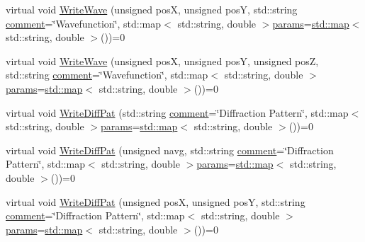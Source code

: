 \begin{DoxyCompactItemize}
\item 
virtual void \hyperlink{class_q_s_t_e_m_1_1_i_wave_af0a308ede62dc83872ccf6efa47e6ed6}{Write\-Wave} (unsigned pos\-X, unsigned pos\-Y, std\-::string \hyperlink{image_sim_8m_aea4cc4bd8e43a7f8ebf9b0ee3da8d681}{comment}=\char`\"{}Wavefunction\char`\"{}, std\-::map$<$ std\-::string, double $>$\hyperlink{image_sim_8m_ad57b218fb254a1624c09ad71cb6b6415}{params}=\hyperlink{_displacement_params_8m_af619c74fd72bdb64d115463dff2720cd}{std\-::map}$<$ std\-::string, double $>$())=0
\item 
virtual void \hyperlink{class_q_s_t_e_m_1_1_i_wave_a9e9f05935b04646a547d2d20e9cf9731}{Write\-Wave} (unsigned pos\-X, unsigned pos\-Y, unsigned pos\-Z, std\-::string \hyperlink{image_sim_8m_aea4cc4bd8e43a7f8ebf9b0ee3da8d681}{comment}=\char`\"{}Wavefunction\char`\"{}, std\-::map$<$ std\-::string, double $>$\hyperlink{image_sim_8m_ad57b218fb254a1624c09ad71cb6b6415}{params}=\hyperlink{_displacement_params_8m_af619c74fd72bdb64d115463dff2720cd}{std\-::map}$<$ std\-::string, double $>$())=0
\item 
virtual void \hyperlink{class_q_s_t_e_m_1_1_i_wave_a1d9416e506e6b86ae844ccec94e14c80}{Write\-Diff\-Pat} (std\-::string \hyperlink{image_sim_8m_aea4cc4bd8e43a7f8ebf9b0ee3da8d681}{comment}=\char`\"{}Diffraction Pattern\char`\"{}, std\-::map$<$ std\-::string, double $>$\hyperlink{image_sim_8m_ad57b218fb254a1624c09ad71cb6b6415}{params}=\hyperlink{_displacement_params_8m_af619c74fd72bdb64d115463dff2720cd}{std\-::map}$<$ std\-::string, double $>$())=0
\item 
virtual void \hyperlink{class_q_s_t_e_m_1_1_i_wave_a97f5d380249b100d5681132090e24a1e}{Write\-Diff\-Pat} (unsigned navg, std\-::string \hyperlink{image_sim_8m_aea4cc4bd8e43a7f8ebf9b0ee3da8d681}{comment}=\char`\"{}Diffraction Pattern\char`\"{}, std\-::map$<$ std\-::string, double $>$\hyperlink{image_sim_8m_ad57b218fb254a1624c09ad71cb6b6415}{params}=\hyperlink{_displacement_params_8m_af619c74fd72bdb64d115463dff2720cd}{std\-::map}$<$ std\-::string, double $>$())=0
\item 
virtual void \hyperlink{class_q_s_t_e_m_1_1_i_wave_ad235239efe950037361fbbab7fb61d0d}{Write\-Diff\-Pat} (unsigned pos\-X, unsigned pos\-Y, std\-::string \hyperlink{image_sim_8m_aea4cc4bd8e43a7f8ebf9b0ee3da8d681}{comment}=\char`\"{}Diffraction Pattern\char`\"{}, std\-::map$<$ std\-::string, double $>$\hyperlink{image_sim_8m_ad57b218fb254a1624c09ad71cb6b6415}{params}=\hyperlink{_displacement_params_8m_af619c74fd72bdb64d115463dff2720cd}{std\-::map}$<$ std\-::string, double $>$())=0
\item 

\end{DoxyCompactItemize}
